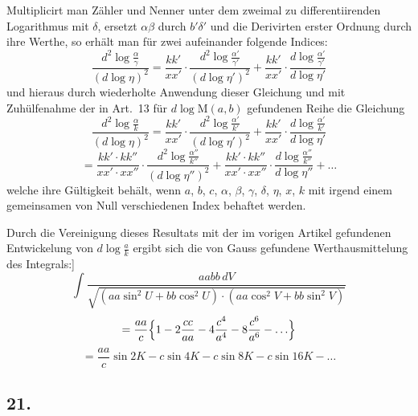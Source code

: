 \documentclass[10pt,a4paper]{article}
\newcommand{\M}{\text{M}}
\begin{document}
Multiplicirt man Z\"ahler und Nenner unter dem zweimal zu differentiirenden
Logarithmus mit $\delta$, ersetzt $\alpha\beta$ durch $b'\delta'$ und die
Derivirten erster Ordnung durch ihre Werthe, so erh\"alt man f\"ur zwei
aufeinander folgende Indices:
\[
\frac{d^2\log\tfrac{\alpha}{\gamma}}{(d\log\eta)^2}
 = \frac{kk'}{xx'}\cdot\frac{d^2\log\tfrac{\alpha'}{\gamma'}}{(d\log\eta')^2}
 + \frac{kk'}{xx'}\cdot\frac{d\log\tfrac{\alpha'}{\gamma'}}{d\log\eta'}
\]
und hieraus durch wiederholte Anwendung dieser Gleichung und mit Zuh\"ulfenahme
der in Art.~13 f\"ur $d\log\M(a,b)$ gefundenen Reihe die Gleichung
\[
\frac{d^2\log\tfrac{\alpha}{k}}{(d\log\eta)^2}
 = \frac{kk'}{xx'}\cdot\frac{d^2\log\tfrac{\alpha'}{k'}}{(d\log\eta')^2}
 + \frac{kk'}{xx'}\cdot\frac{d\log\tfrac{\alpha'}{k'}}{d\log\eta'}
\]
\[
 = \frac{kk'\cdot kk''}{xx'\cdot xx''}\cdot
   \frac{d^2\log\tfrac{\alpha''}{k''}}{(d\log\eta'')^2}
 + \frac{kk'\cdot kk''}{xx'\cdot xx''}\cdot
   \frac{d\log\tfrac{\alpha''}{k''}}{d\log\eta''} + \ldots
\]
welche ihre G\"ultigkeit beh\"alt, wenn $a$, $b$, $c$, $\alpha$, $\beta$,
$\gamma$, $\delta$, $\eta$, $x$, $k$ mit irgend einem gemeinsamen von Null
verschiedenen Index behaftet werden.

Durch die Vereinigung dieses Resultats mit der im vorigen Artikel gefundenen
Entwickelung von $d\log\tfrac{a}{k}$ ergibt sich die von Gauss gefundene
Werthausmittelung des Integrals:]
\[
\int\!\frac{aabb\,dV}{\sqrt{(aa\sin^2 U + bb\cos^2 U)\cdot(aa\cos^2 V + bb\sin^2 V)}}
\]
\[
 = \frac{aa}{c}\Bigl\{1 - 2\frac{cc}{aa} - 4\frac{c^4}{a^4}
   - 8\frac{c^6}{a^6} - \ldots\Bigr\}
\]
\[
 = \frac{aa}{c}\sin 2K - c\sin 4K - c\sin 8K - c\sin 16K - \ldots
\]


\subsection*{21.}
\end{document}
